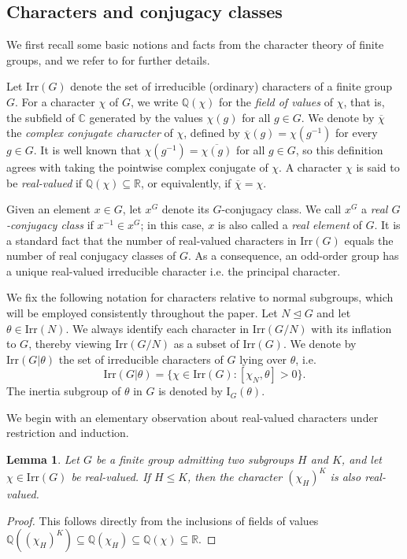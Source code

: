 \documentclass[10pt]{article}
\newtheorem{lem}{\bf Lemma}[section]
\begin{document}
\subsection{Characters and conjugacy classes}

We first recall some basic notions and facts from the character theory of finite groups,
and we refer to \cite{isaacs76,huppert98,navarro18} for further details.

Let $\mathrm{Irr}(G)$ denote the set of irreducible (ordinary) characters of a finite group $G$.
For a character $\chi$ of $G$, we write $\mathbb{Q}(\chi)$ for the \emph{field of values} of $\chi$, that is, the subfield of $\mathbb{C}$ generated by the values $\chi(g)$ for all $g \in G$.
We denote by $\overline{\chi}$ the \emph{complex conjugate character} of $\chi$, defined by $\overline{\chi}(g) = \chi(g^{-1})$ for every $g \in G$.
It is well known that $\chi(g^{-1})=\overline{\chi(g)}$ for all $g\in G$, so this definition agrees with taking the pointwise complex conjugate of $\chi$.
A character $\chi$ is said to be \emph{real-valued} if $\mathbb{Q}(\chi) \subseteq \mathbb{R}$, or equivalently, if $\overline{\chi} = \chi$.



Given an element $x \in G$, let $x^G$ denote its $G$-conjugacy class.
We call $x^G$ a \emph{real $G$-conjugacy class} if $x^{-1} \in x^G$; in this case, $x$ is also called a \emph{real element} of $G$.
It is a standard fact that the number of real-valued characters in $\mathrm{Irr}(G)$ equals 
the number of real conjugacy classes of $G$.
As a consequence, an odd-order group has a unique real-valued irreducible character i.e. the principal character.




We fix the following notation for characters relative to normal subgroups, which will be employed consistently throughout the paper.
Let $N \unlhd G$ and let $\theta \in \mathrm{Irr}(N)$.
We always identify each character in $\mathrm{Irr}(G/N)$ with its inflation to $G$, thereby viewing $\mathrm{Irr}(G/N)$ as a subset of $\mathrm{Irr}(G)$. 
We denote by $\mathrm{Irr}(G | \theta)$ the set of irreducible characters of $G$ lying over $\theta$, i.e.
\[
\mathrm{Irr}(G|\theta)=\{ \chi\in \mathrm{Irr}(G): [\chi_N,\theta]>0 \}.
\] 
The inertia subgroup of $\theta$ in $G$ is denoted by $\mathrm{I}_G(\theta)$.


We begin with an elementary observation about real-valued characters under restriction and induction.

\begin{lem}\label{lem: res and ind}
  Let $G$ be a finite group admitting two subgroups $H$ and $K$, and let $\chi\in \mathrm{Irr}(G)$ be real-valued.
  If $H\leq K$, then the character $(\chi_H)^{K}$ is also real-valued.
\end{lem}
\begin{proof}
  This follows directly from the inclusions of fields of values $\mathbb{Q}((\chi_H)^{K})\subseteq \mathbb{Q}(\chi_H)\subseteq \mathbb{Q}(\chi)\subseteq \mathbb{R}$.
\end{proof}
\end{document}
